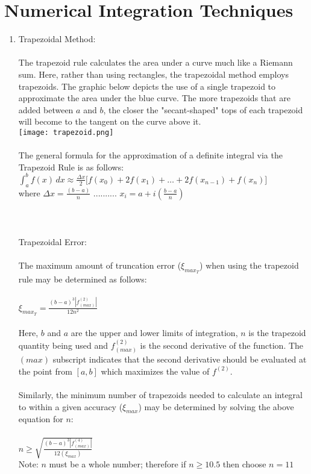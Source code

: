 \documentclass{report}
\begin{document}
\section{Numerical Integration Techniques}
\begin{enumerate}
\item Trapezoidal Method:
\\
\\
The trapezoid rule calculates the area under a curve much like a Riemann sum. Here, rather than using rectangles, the trapezoidal method employs trapezoids. The graphic below depicts the use of a single trapezoid to approximate the area under the blue curve. The more trapezoids that are added between $a$ and $b$, the closer the "secant-shaped" tops of each trapezoid will become to the tangent on the curve above it.\\
\texttt{[image: trapezoid.png]}
\\
\\
The general formula for the approximation of a definite integral via the Trapezoid Rule is as follows:
\\ $\displaystyle \int^b_a f(x)\,dx  \approx  \frac{\Delta x}{2}\Big[f(x_{0})+2f(x_1)+\ldots+2f(x_{n-1})+f(x_n)\Big]$ 
\\where $\displaystyle \Delta x = \frac{(b-a)}{n}$ .......... $\displaystyle x_i = a + i(\frac{b-a}{n})$
\\
\\
\\
\\Trapezoidal Error: 
\\
\\The maximum amount of truncation error ($\xi_{max_{T}}$) when using the trapezoid rule may be determined as follows:
\\
\\$\displaystyle \xi_{max_{T}} = \frac{(b-a)^{3}\left|f^{(2)}_{(max)}\right|}{12n^2}$\\ \\Here, $\displaystyle b$ and $\displaystyle a$ are the upper and lower limits of integration, $\displaystyle n$ is the trapezoid quantity being used and $f^{(2)}_{(max)}$ is the second derivative of the function. The $(max)$ subscript indicates that the second derivative should be evaluated at the point from $\displaystyle [a,b]$ which maximizes the value of $f^{(2)}$.
\\
\\Similarly, the minimum number of trapezoids needed to calculate an integral to within a given accuracy ($\xi_{max}$) may be determined by solving the above equation for $\displaystyle n$: 
\\
\\
$\displaystyle n \geq \sqrt{\frac{(b-a)^{3}\left|f^{(4)}_{(max)}\right|}{12(\xi_{max})}} $
\\Note: $\displaystyle n$ must be a whole number; therefore if $n \geq 10.5$ then choose $n = 11$



\end{enumerate}
\end{document}
